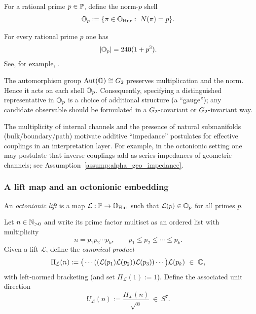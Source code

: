 \begin{definition}
\label{def:prime_shells}
For a rational prime $p\in\mathbb{P}$, define the norm-$p$ shell
$$
\OO_p:=\{\pi\in\OHur:\ N(\pi)=p\}.
$$
\end{definition}

\begin{proposition}
\label{prop:prime_shell_count}
For every rational prime $p$ one has
$$
|\mathbb{O}_p| = 240(1+p^3).
$$
See, for example, \cite{ConwaySmith2003}.
\end{proposition}

\begin{remark}
The automorphism group $\mathrm{Aut}(\mathbb{O})\cong G_2$ preserves multiplication and the norm. Hence it acts on each shell $\mathbb{O}_p$.
Consequently, specifying a distinguished representative in $\mathbb{O}_p$ is a choice of additional structure (a ``gauge''); any candidate observable should be formulated in a $G_2$-covariant or $G_2$-invariant way.
\end{remark}

\begin{remark}
The multiplicity of internal channels and the presence of natural submanifolds (bulk/boundary/path) motivate additive ``impedance'' postulates for effective couplings in an interpretation layer.
For example, in the octonionic setting one may postulate that inverse couplings add as series impedances of geometric channels; see Assumption~\ref{assump:alpha_geo_impedance}.
\end{remark}

\subsubsection{A lift map and an octonionic embedding}
\begin{definition}
\label{def:lift_map}
An \emph{octonionic lift} is a map $\mathcal{L}:\mathbb{P}\to\mathbb{O}_{\mathrm{Hur}}$ such that $\mathcal{L}(p)\in\mathbb{O}_p$ for all primes $p$.
\end{definition}

\begin{definition}
\label{def:Pi_L}
Let $n\in\mathbb{N}_{>0}$ and write its prime factor multiset as an ordered list with multiplicity
$$
n=p_1p_2\cdots p_k,\qquad p_1\le p_2\le\cdots\le p_k.
$$
Given a lift $\mathcal{L}$, define the \emph{canonical product}
$$
\Pi_{\mathcal{L}}(n):=\big(\cdots((\mathcal{L}(p_1)\mathcal{L}(p_2))\mathcal{L}(p_3))\cdots \big)\mathcal{L}(p_k)\ \in\ \mathbb{O},
$$
with left-normed bracketing (and set $\Pi_{\mathcal{L}}(1):=1$).
Define the associated unit direction
$$
U_{\mathcal{L}}(n):=\frac{\Pi_{\mathcal{L}}(n)}{\sqrt{n}}\ \in\ S^7.
$$
\end{definition}

